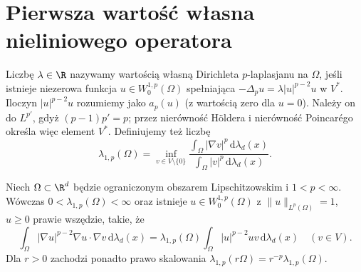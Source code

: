 \section{Pierwsza wartość własna nieliniowego operatora}
\begin{definicja}
\label{def:pde26-eigen}
Liczbę $\lambda\in\R$ nazywamy wartością własną
Dirichleta $p$-laplasjanu na $\Omega$, jeśli istnieje
niezerowa funkcja $u\in W_0^{1,p}(\Omega)$ spełniająca
$-\Delta_pu=\lambda|u|^{p-2}u$ w $V^*$.
Iloczyn $|u|^{p-2}u$ rozumiemy jako $a_p(u)$
(z wartością zero dla $u=0$). Należy on do $L^{p'}$,
gdyż $(p-1)p'=p$; przez nierówność Höldera i
nierówność Poincarégo określa więc element $V^*$.
Definiujemy też liczbę
\[
 \lambda_{1,p}(\Omega)=
 \inf_{v\in V\setminus\{0\}}
 \frac{\int_\Omega|\nabla v|^p\,\mathrm d\lambda_d(x)}
 {\int_\Omega|v|^p\,\mathrm d\lambda_d(x)}.
\]
\end{definicja}
\begin{twierdzenie}
\label{thm:pde26-eigen}
Niech $\Omega\subset\R^d$ będzie ograniczonym obszarem
Lipschitzowskim i $1<p<\infty$.
Wówczas $0<\lambda_{1,p}(\Omega)<\infty$ oraz
istnieje $u\in W_0^{1,p}(\Omega)$ z
$\|u\|_{L^p(\Omega)}=1$, $u\ge0$ prawie wszędzie,
takie, że
\[
 \int_\Omega|\nabla u|^{p-2}\nabla u\cdot\nabla v
 \,\mathrm d\lambda_d(x)=
 \lambda_{1,p}(\Omega)
 \int_\Omega |u|^{p-2}uv\,\mathrm d\lambda_d(x)
 \quad(v\in V).
\]
Dla $r>0$ zachodzi ponadto prawo skalowania
$\lambda_{1,p}(r\Omega)=r^{-p}\lambda_{1,p}(\Omega)$.
\end{twierdzenie}
